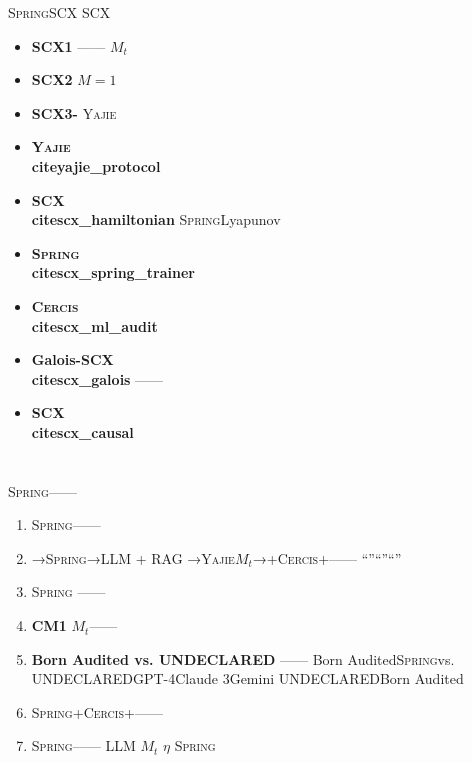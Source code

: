 \documentclass[12pt,a4paper]{article}
\theoremstyle{remark}
\newcommand{\Spring}{\textsc{Spring}}
\newcommand{\Yajie}{\textsc{Yajie}}
\newcommand{\Cercis}{\textsc{Cercis}}
\begin{document}
\Spring{}SCX
SCX

\begin{itemize}[itemsep=3pt]
    \item \textbf{SCX1} ——
    $M_t$
    \item \textbf{SCX2} $M=1$
    \item \textbf{SCX3-} \Yajie{}
    \item \textbf{\Yajie{}~\\cite{yajie_protocol}} 
    \item \textbf{SCX~\\cite{scx_hamiltonian}} \Spring{}Lyapunov
    \item \textbf{\Spring{}~\\cite{scx_spring_trainer}} 
    \item \textbf{\Cercis{}~\\cite{scx_ml_audit}} 
    \item \textbf{Galois-SCX~\\cite{scx_galois}} ——
    \item \textbf{SCX~\\cite{scx_causal}} 
\end{itemize}

\newpage

\section{}

\Spring{}——


\begin{enumerate}[label=(\arabic*),itemsep=4pt]
    \item \textbf{}
    \Spring{}——
    

    \item \textbf{}
    →\Spring{}→LLM + RAG
    →\Yajie{}$M_t$→+\Cercis{}+——
    “”“”“”

    \item \textbf{}
    \Spring{}
    ——

    \item \textbf{CM1}
    $M_t$——
    

    \item \textbf{Born Audited vs. UNDECLARED}
    ——
    Born Audited\Spring{}vs. UNDECLAREDGPT-4Claude 3Gemini
    UNDECLAREDBorn Audited

    \item \textbf{}
    \Spring{}+\Cercis{}+——
    

    \item \textbf{}
    \Spring{}——
    LLM
    $M_t$
    $\eta$
    \Spring{}
\end{enumerate}
\end{document}
